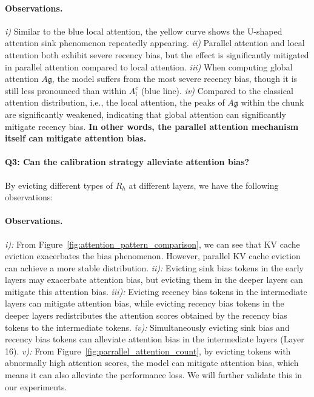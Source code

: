 \paragraph{Observations.} \textit{i)} Similar to the blue local attention, the yellow curve shows the U-shaped attention sink phenomenon repeatedly appearing. \textit{ii)} Parallel attention and local attention both exhibit severe recency bias, but the effect is significantly mitigated in parallel attention compared to local attention. \textit{iii)} When computing global attention \( A{\mathfrak{g}} \), the model suffers from the most severe recency bias, though it is still less pronounced than within \( A^c_{\mathfrak{l}} \) (blue line). \textit{iv)} Compared to the classical attention distribution, i.e., the local attention, the peaks of \( A{\mathfrak{g}} \) within the chunk are significantly weakened, indicating that global attention can significantly mitigate recency bias. \textbf{In other words, the parallel attention mechanism itself can mitigate attention bias.}

\paragraph{Q3: Can the calibration strategy alleviate attention bias?}
\label{Q3}

By evicting different types of \(R_h\) at different layers, we have the following observations:
\vspace{-2mm}
\paragraph{Observations.} \textit{i):} From Figure~\ref{fig:attention_pattern_comparison}, we can see that KV cache eviction exacerbates the bias phenomenon. However, parallel KV cache eviction can achieve a more stable distribution. \textit{ii):} Evicting sink bias tokens in the early layers may exacerbate attention bias, but evicting them in the deeper layers can mitigate this attention bias. \textit{iii):} Evicting recency bias tokens in the intermediate layers can mitigate attention bias, while evicting recency bias tokens in the deeper layers redistributes the attention scores obtained by the recency bias tokens to the intermediate tokens. \textit{iv):}  Simultaneously evicting sink bias and recency bias tokens can alleviate attention bias in the intermediate layers (Layer 16). \textit{v):} From Figure~\ref{fig:parrallel_attention_count}, by evicting tokens with abnormally high attention scores, the model can mitigate attention bias, which means it can also alleviate the performance loss. We will further validate this in our experiments.





